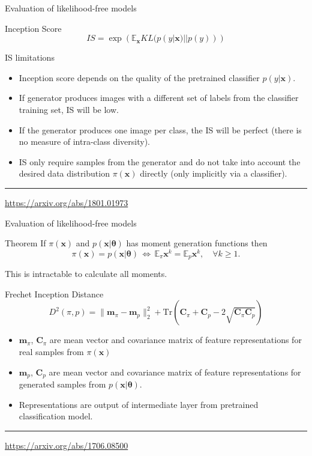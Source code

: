\documentclass{beamer}
\newcommand{\bx}{\mathbf{x}}
\newcommand{\bC}{\mathbf{C}}
\newcommand{\bbE}{\mathbb{E}}
\newcommand{\btheta}{\boldsymbol{\theta}}
\begin{document}
\begin{frame}{Evaluation of likelihood-free models}
	\begin{block}{Inception Score}
		\vspace{-0.1cm}
		\[
			IS =  \exp \left( \bbE_{\bx} KL(p(y | \bx) || p(y)) \right)
		\]
		\vspace{-0.1cm}
	\end{block}
	\begin{block}{IS limitations}
		\begin{itemize}
			\item Inception score depends on the quality of the pretrained classifier $p(y | \bx)$.
			\item If generator produces images with a different set of labels from the classifier training set, IS will be low.
			\item If the generator produces one image per class, the IS will be perfect (there is no measure of intra-class diversity).
			\item IS only require samples from the generator and do not take into account the desired data distribution $\pi(\bx)$ directly (only implicitly via a classifier).
		\end{itemize}
	\end{block}
	\vfill
	\hrule\medskip 
	{\scriptsize \href{https://arxiv.org/abs/1801.01973}{https://arxiv.org/abs/1801.01973}}
\end{frame}
\begin{frame}{Evaluation of likelihood-free models}
	\begin{block}{Theorem}
		If $\pi(\bx)$ and $p(\bx | \btheta)$ has moment generation functions then
		\[
			\pi(\bx) = p(\bx | \btheta) \, \Leftrightarrow \, \bbE_{\pi} \bx^k = \bbE_{p} \bx^k, \quad \forall k \geq 1.
		\]
	\end{block}
	This is intractable to calculate all moments.
	\begin{block}{Frechet Inception Distance}
		\vspace{-0.1cm}
		\[
			D^2 (\pi, p) = \| \mathbf{m}_{\pi} - \mathbf{m}_{p}\|_2^2 + \text{Tr} \left( \bC_{\pi} + \bC_p - 2 \sqrt{\bC_{\pi} \bC_p} \right)
		\]
	\end{block}
	\begin{itemize}
		\item $\mathbf{m}_{\pi}$, $\bC_{\pi} $ are mean vector and covariance matrix of feature representations for real samples from $\pi(\bx)$
		\item $\mathbf{m}_{p}$, $\bC_p$ are mean vector and covariance matrix of feature representations for generated samples from $p(\bx | \btheta)$.
		\item Representations are output of intermediate layer from pretrained classification model.
	\end{itemize} 

	\vfill
	\hrule\medskip 
	{\scriptsize \href{https://arxiv.org/abs/1706.08500}{https://arxiv.org/abs/1706.08500}}
\end{frame}
\end{document}
